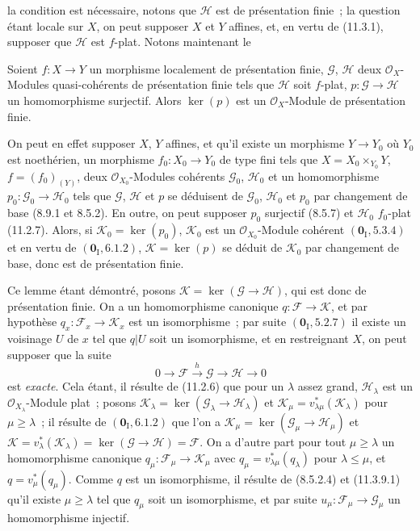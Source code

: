 
la condition est nécessaire, notons que $\mathcal H$ est de présentation
finie~; la question étant locale sur $X$, on peut supposer $X$ et $Y$ affines,
et, en vertu de (11.3.1), supposer que $\mathcal H$ est $f$-plat. Notons
maintenant le

\begin{lemma}[11.3.9.1]
\label{IV.11.3.9.1-fr}
Soient $f:X\to Y$ un morphisme localement de présentation finie,
$\mathcal G$, $\mathcal H$ deux $\mathcal O_X$-Modules quasi-cohérents de
présentation finie tels que $\mathcal H$ soit $f$-plat,
$p:\mathcal G\to\mathcal H$ un homomorphisme surjectif. Alors $\ker(p)$ est un
$\mathcal O_X$-Module de présentation finie.
\end{lemma}

On peut en effet supposer $X$, $Y$ affines, et qu'il existe un morphisme
$Y\to Y_0$ où $Y_0$ est noethérien, un morphisme $f_0:X_0\to Y_0$ de type fini
tels que $X=X_0\times_{Y_0}Y$, $f=(f_0)_{(Y)}$, deux
$\mathcal O_{X_0}$-Modules cohérents $\mathcal G_0$, $\mathcal H_0$ et un
homomorphisme $p_0:\mathcal G_0\to\mathcal H_0$ tels que $\mathcal G$,
$\mathcal H$ et $p$ se déduisent de $\mathcal G_0$, $\mathcal H_0$ et $p_0$ par
changement de base (8.9.1 et 8.5.2). En outre, on peut supposer $p_0$ surjectif
(8.5.7) et $\mathcal H_0$ $f_0$-plat (11.2.7). Alors, si
$\mathcal K_0=\ker(p_0)$, $\mathcal K_0$ est un
$\mathcal O_{X_0}$-Module cohérent $(\mathbf 0_{\mathrm I},5.3.4)$ et en vertu
de $(\mathbf 0_{\mathrm I},6.1.2)$, $\mathcal K=\ker(p)$ se déduit de
$\mathcal K_0$ par changement de base, donc est de présentation finie.

Ce lemme étant démontré, posons $\mathcal K=\ker(\mathcal G\to\mathcal H)$,
qui est donc de présentation finie. On a un homomorphisme canonique
$q:\mathcal F\to\mathcal K$, et par hypothèse
$q_x:\mathcal F_x\to\mathcal K_x$ est un isomorphisme~; par suite
$(\mathbf 0_{\mathrm I},5.2.7)$ il existe un voisinage $U$ de $x$ tel que
$q|U$ soit un isomorphisme, et en restreignant $X$, on peut supposer que la
suite
\[
0\longrightarrow\mathcal F\xrightarrow{h}\mathcal G
\longrightarrow\mathcal H\longrightarrow0
\]
est \emph{exacte}. Cela étant, il résulte de (11.2.6) que pour un $\lambda$
assez grand, $\mathcal H_\lambda$ est un $\mathcal O_{X_\lambda}$-Module plat~;
posons $\mathcal K_\lambda=\ker(\mathcal G_\lambda\to\mathcal H_\lambda)$ et
$\mathcal K_\mu=v_{\lambda\mu}^*(\mathcal K_\lambda)$ pour $\mu\geq\lambda$~;
il résulte de $(\mathbf 0_{\mathrm I},6.1.2)$ que l'on a
$\mathcal K_\mu=\ker(\mathcal G_\mu\to\mathcal H_\mu)$ et
$\mathcal K=v_\lambda^*(\mathcal K_\lambda)
=\ker(\mathcal G\to\mathcal H)=\mathcal F$. On a d'autre part pour tout
$\mu\geq\lambda$ un homomorphisme canonique
$q_\mu:\mathcal F_\mu\to\mathcal K_\mu$ avec
$q_\mu=v_{\lambda\mu}^*(q_\lambda)$ pour $\lambda\leq\mu$, et
$q=v_\mu^*(q_\mu)$. Comme $q$ est un isomorphisme, il résulte de (8.5.2.4) et
(11.3.9.1) qu'il existe $\mu\geq\lambda$ tel que $q_\mu$ soit un isomorphisme,
et par suite $u_\mu:\mathcal F_\mu\to\mathcal G_\mu$ un homomorphisme
injectif.


